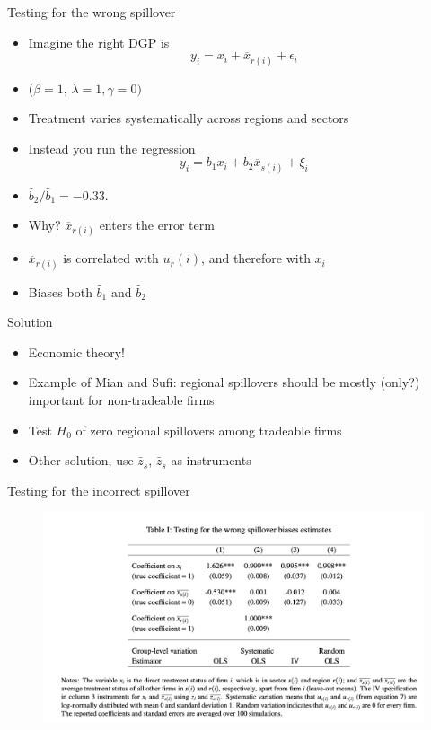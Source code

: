 \documentclass[english,xcolor=svgnames]{beamer}
\begin{document}
\begin{frame}{Testing for the wrong spillover}
\begin{itemize}
\item Imagine the right DGP is
\[y_i = x_i + \overline{x}_{r(i)} + \epsilon_i\]
\item ($\beta = 1$, $\lambda = 1, \gamma = 0)$
\item Treatment varies systematically across regions and sectors
\item Instead you run the regression
\[y_i = b_1 x_i + b_2 \overline{x}_{s(i)} + \xi_i\]
\item $\hat{b}_2/\hat{b}_1 = -0.33$.
\item Why? $\overline{x}_{r(i)}$ enters the error term 
\item $\overline{x}_{r(i)}$ is correlated with $u_r(i)$, and therefore with $x_i$
\item Biases both $\hat{b}_1$ and $\hat{b}_2$
\end{itemize}
\end{frame}

\begin{frame}{Solution}
\begin{itemize}
\item Economic theory!
\item Example of Mian and Sufi: regional spillovers should be mostly (only?) important for non-tradeable firms
\item Test $H_0$ of zero regional spillovers among tradeable firms
\item Other solution, use $\bar{z}_s$, $\bar{z}_s$ as instruments
\end{itemize}
\end{frame}


\begin{frame}{Testing for the incorrect spillover}
\begin{figure}
\includegraphics[scale=0.35]{figures/h_ge_6}
\end{figure}
\end{frame}
\end{document}

